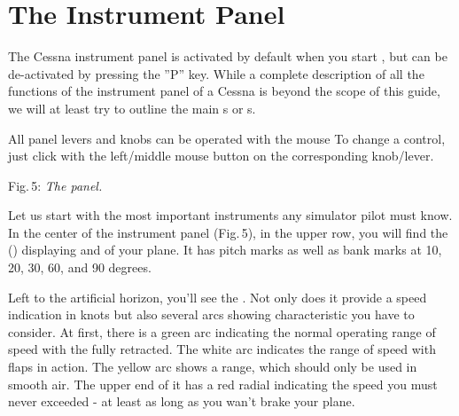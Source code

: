 \section{The Instrument Panel}

The Cessna instrument panel is activated by default when you start \FlightGear{}$\!$, but can be
de-activated by pressing the ''P'' key.  While a complete description of all the
functions of the instrument panel of a Cessna is beyond the scope of this guide, we will
at least try to outline the main s or s.

All panel levers and knobs can be operated with the mouse To change a control, just click with the left/middle mouse button on the corresponding knob/lever. 
\medskip

 \centerline{}

\smallskip
 \noindent
Fig.\,5: \textit{The panel.}
\medskip

Let us start with the most important instruments any simulator pilot must know. In the
center of the instrument panel (Fig.\,5), in the upper row, you will find the
 () displaying  and
 of your plane. It has pitch marks as well as bank marks at 10, 20, 30, 60,
and 90 degrees.

Left to the artificial horizon, you'll see the . Not only does
it provide a speed indication in knots but also several arcs showing characteristic
 you have to consider. At first, there is a green arc indicating
the normal operating range of speed with the  fully retracted. The white arc
indicates the range of speed with flaps in action. The yellow arc shows a range, which
should only be used in smooth air. The upper end of it has a red radial indicating the
speed you must never exceeded - at least as long as you wan't brake your plane.

